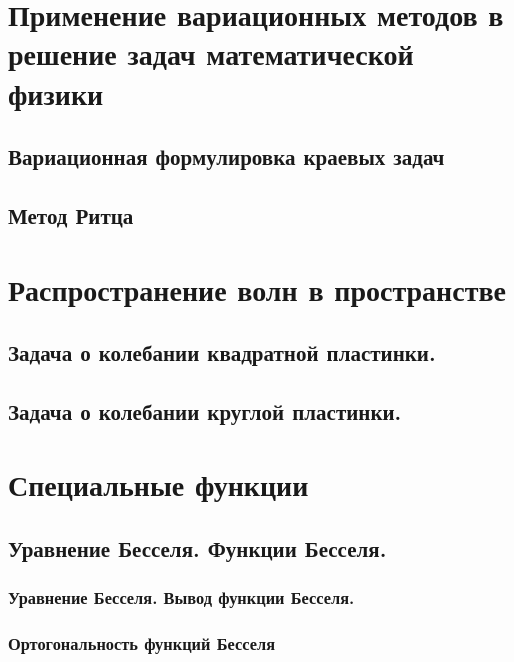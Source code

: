 \documentclass[12pt, a4paper]{article}
\begin{document}
\section{Применение вариационных методов в решение задач математической физики}
	\subsection{Вариационная формулировка краевых задач}\label{que:35}
			 \newpage

	\subsection{Метод Ритца}\label{que:36}
			 \newpage


\section{Распространение волн в пространстве}

	\subsection{Задача о колебании квадратной пластинки.}\label{que:14}
		 \newpage

	\subsection{Задача о колебании круглой пластинки.}
		 \newpage

	
\section{Специальные функции}
	\subsection{Уравнение Бесселя. Функции Бесселя.}
		\subsubsection{Уравнение Бесселя. Вывод функции Бесселя.}\label{que:31}
			 
		\subsubsection{Ортогональность функций Бесселя}\label{que:32}
			\newpage
	
\end{document}
